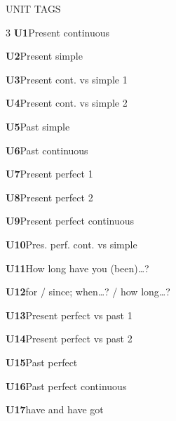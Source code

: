 \documentclass[11pt,a4paper]{article}
\begin{document}
\vspace{4mm}
\begin{infobox}{UNIT TAGS}
\begin{multicols}{3}\small\RaggedRight
\textbf{U1}\enspace Present continuous\par
\textbf{U2}\enspace Present simple\par
\textbf{U3}\enspace Present cont. vs simple 1\par
\textbf{U4}\enspace Present cont. vs simple 2\par
\textbf{U5}\enspace Past simple\par
\textbf{U6}\enspace Past continuous\par
\textbf{U7}\enspace Present perfect 1\par
\textbf{U8}\enspace Present perfect 2\par
\textbf{U9}\enspace Present perfect continuous\par
\textbf{U10}\enspace Pres. perf. cont. vs simple\par
\textbf{U11}\enspace How long have you (been)…?\par
\textbf{U12}\enspace for / since; when…? / how long…?\par
\textbf{U13}\enspace Present perfect vs past 1\par
\textbf{U14}\enspace Present perfect vs past 2\par
\textbf{U15}\enspace Past perfect\par
\textbf{U16}\enspace Past perfect continuous\par
\textbf{U17}\enspace have and have got\par
\end{multicols}
\end{infobox}
\end{document}

